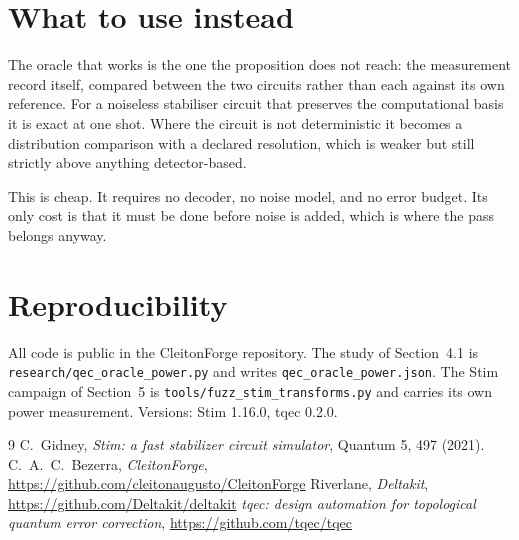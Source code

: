 \documentclass[twocolumn,10pt]{article}
\begin{document}
\section{What to use instead}

The oracle that works is the one the proposition does not reach: the measurement
record itself, compared between the two circuits rather than each against its
own reference. For a noiseless stabiliser circuit that preserves the
computational basis it is exact at one shot. Where the circuit is not
deterministic it becomes a distribution comparison with a declared resolution,
which is weaker but still strictly above anything detector-based.

This is cheap. It requires no decoder, no noise model, and no error budget. Its
only cost is that it must be done before noise is added, which is where the pass
belongs anyway.

\section{Reproducibility}

All code is public in the CleitonForge repository. The study of
Section~4.1 is \texttt{research/qec\_oracle\_power.py} and writes
\texttt{qec\_oracle\_power.json}. The Stim campaign of Section~5 is
\texttt{tools/fuzz\_stim\_transforms.py} and carries its own power measurement.
Versions: Stim 1.16.0, tqec 0.2.0.

\begin{thebibliography}{9}
 C.~Gidney, \emph{Stim: a fast stabilizer circuit
simulator}, Quantum 5, 497 (2021).
 C.~A.~C.~Bezerra, \emph{CleitonForge}, \\
\url{https://github.com/cleitonaugusto/CleitonForge}
 Riverlane, \emph{Deltakit}, \\
\url{https://github.com/Deltakit/deltakit}
 \emph{tqec: design automation for topological quantum error
correction}, \url{https://github.com/tqec/tqec}
\end{thebibliography}
\end{document}
